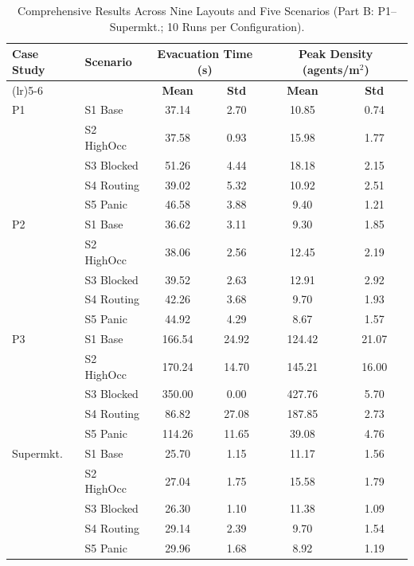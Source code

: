 \documentclass[utf8]{FrontiersinHarvard}
\begin{document}
\begin{table}[t]
\centering
\caption{Comprehensive Results Across Nine Layouts and Five Scenarios (Part B: P1--Supermkt.; 10 Runs per Configuration).}
\label{tab:results_main_partb}
{\tiny
\setlength{\tabcolsep}{2.5pt}
\renewcommand{\arraystretch}{0.86}
\begin{tabular}{>{\raggedright\arraybackslash}p{1.15cm}>{\raggedright\arraybackslash}p{1.30cm}cccc}
\toprule
\textbf{Case Study} & \textbf{Scenario} & \multicolumn{2}{c}{\textbf{Evacuation Time (s)}} & \multicolumn{2}{c}{\textbf{Peak Density (agents/m$^2$)}} \\
\cmidrule(lr){3-4} \cmidrule(lr){5-6}
& & \textbf{Mean} & \textbf{Std} & \textbf{Mean} & \textbf{Std} \\
\midrule
P1 & S1 Base & 37.14 & 2.70 & 10.85 & 0.74 \\
 & S2 HighOcc & 37.58 & 0.93 & 15.98 & 1.77 \\
 & S3 Blocked & 51.26 & 4.44 & 18.18 & 2.15 \\
 & S4 Routing & 39.02 & 5.32 & 10.92 & 2.51 \\
 & S5 Panic & 46.58 & 3.88 & 9.40 & 1.21 \\
\midrule
P2 & S1 Base & 36.62 & 3.11 & 9.30 & 1.85 \\
 & S2 HighOcc & 38.06 & 2.56 & 12.45 & 2.19 \\
 & S3 Blocked & 39.52 & 2.63 & 12.91 & 2.92 \\
 & S4 Routing & 42.26 & 3.68 & 9.70 & 1.93 \\
 & S5 Panic & 44.92 & 4.29 & 8.67 & 1.57 \\
\midrule
P3 & S1 Base & 166.54 & 24.92 & 124.42 & 21.07 \\
 & S2 HighOcc & 170.24 & 14.70 & 145.21 & 16.00 \\
 & S3 Blocked & 350.00 & 0.00 & 427.76 & 5.70 \\
 & S4 Routing & 86.82 & 27.08 & 187.85 & 2.73 \\
 & S5 Panic & 114.26 & 11.65 & 39.08 & 4.76 \\
\midrule
Supermkt. & S1 Base & 25.70 & 1.15 & 11.17 & 1.56 \\
 & S2 HighOcc & 27.04 & 1.75 & 15.58 & 1.79 \\
 & S3 Blocked & 26.30 & 1.10 & 11.38 & 1.09 \\
 & S4 Routing & 29.14 & 2.39 & 9.70 & 1.54 \\
 & S5 Panic & 29.96 & 1.68 & 8.92 & 1.19 \\
\bottomrule
\end{tabular}
}
\end{table}
\end{document}
